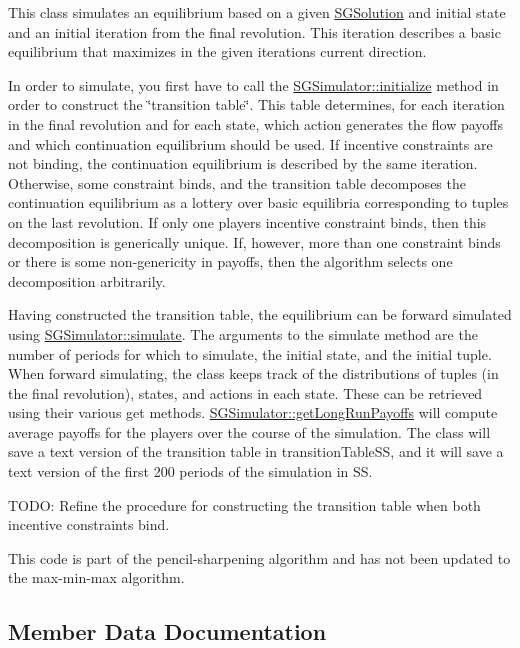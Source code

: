 This class simulates an equilibrium based on a given \hyperlink{classSGSolution}{S\+G\+Solution} and initial state and an initial iteration from the final revolution. This iteration describes a basic equilibrium that maximizes in the given iteration\textquotesingle{}s current direction.

In order to simulate, you first have to call the \hyperlink{classSGSimulator_a1997cb6546587e80102a430240315a14}{S\+G\+Simulator\+::initialize} method in order to construct the \char`\"{}transition table\char`\"{}. This table determines, for each iteration in the final revolution and for each state, which action generates the flow payoffs and which continuation equilibrium should be used. If incentive constraints are not binding, the continuation equilibrium is described by the same iteration. Otherwise, some constraint binds, and the transition table decomposes the continuation equilibrium as a lottery over basic equilibria corresponding to tuples on the last revolution. If only one player\textquotesingle{}s incentive constraint binds, then this decomposition is generically unique. If, however, more than one constraint binds or there is some non-\/genericity in payoffs, then the algorithm selects one decomposition arbitrarily.

Having constructed the transition table, the equilibrium can be forward simulated using \hyperlink{classSGSimulator_ab2c60082ceca6857243a717350bec322}{S\+G\+Simulator\+::simulate}. The arguments to the simulate method are the number of periods for which to simulate, the initial state, and the initial tuple. When forward simulating, the class keeps track of the distributions of tuples (in the final revolution), states, and actions in each state. These can be retrieved using their various get methods. \hyperlink{classSGSimulator_a7d46973b0ed5bc9ef7ddfeebb58e4615}{S\+G\+Simulator\+::get\+Long\+Run\+Payoffs} will compute average payoffs for the players over the course of the simulation. The class will save a text version of the transition table in transition\+Table\+SS, and it will save a text version of the first 200 periods of the simulation in SS.

T\+O\+DO\+: Refine the procedure for constructing the transition table when both incentive constraints bind.

This code is part of the pencil-\/sharpening algorithm and has not been updated to the max-\/min-\/max algorithm. 

\subsection{Member Data Documentation}
\mbox{\label{classSGSimulator_a1fb1f41050dfe3067fc42723cdd8b6f2}} 
